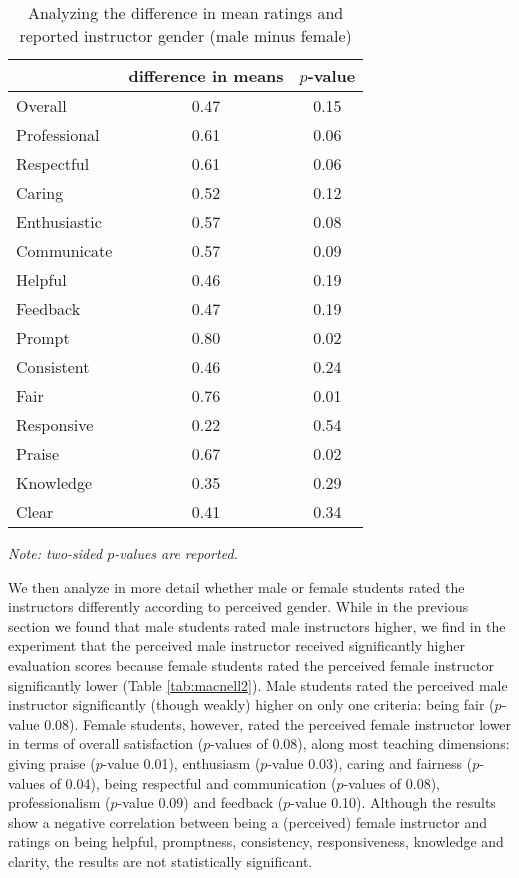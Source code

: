 \documentclass[12pt]{article}
\begin{document}
\begin{table}[htbp]
  \centering
  \footnotesize 
  \caption{Analyzing the difference in mean ratings and reported instructor gender (male minus female)}
    \begin{tabular}{lcc}
    \toprule 
                          & difference in means  & $p$-value  \\
   \midrule
    Overall &                 0.47       & 0.15   \\
    Professional &            0.61       & 0.06   \\
    Respectful			   &  0.61       & 0.06   \\
    Caring &                  0.52       & 0.12    \\
    Enthusiastic   &          0.57       & 0.08     \\
    Communicate        &      0.57       & 0.09     \\
    Helpful   &               0.46       & 0.19     \\
    Feedback   &              0.47       & 0.19     \\
    Prompt    &               0.80       & 0.02     \\
    Consistent   &            0.46       & 0.24     \\
    Fair   &                  0.76       & 0.01     \\
    Responsive   &            0.22       & 0.54     \\
    Praise   &                0.67       & 0.02     \\
    Knowledge   &             0.35       & 0.29     \\
    Clear   &                 0.41       & 0.34     \\
    \bottomrule
    \end{tabular}%
 \label{tab:macnell1}%
  
  \textit{Note: two-sided $p$-values are reported.}
\end{table}%
\normalsize


We then analyze in more detail whether male or female students rated the instructors differently according to perceived gender. While in the previous section we found that male students rated male instructors higher, we find in the \citet{MacNell2014} experiment that the perceived male instructor received significantly higher evaluation scores because female students rated the perceived female instructor significantly lower (Table  \ref{tab:macnell2}). Male students rated the perceived male instructor significantly (though weakly) higher on only one criteria: being fair ($p$-value 0.08). Female students, however, rated the perceived female instructor lower in terms of overall satisfaction ($p$-values of 0.08), along most teaching dimensions: giving praise ($p$-value 0.01), enthusiasm ($p$-value 0.03), caring and fairness ($p$-values of 0.04), being respectful and communication ($p$-values of 0.08), professionalism ($p$-value 0.09) and feedback ($p$-value 0.10). Although the results show a negative correlation between being a (perceived) female instructor and ratings on being helpful, promptness, consistency, responsiveness, knowledge and clarity, the results are not statistically significant.
\end{document}
